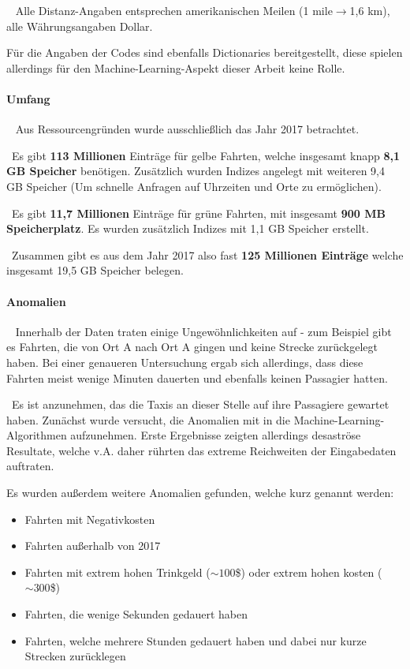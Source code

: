 ~\newline
Alle Distanz-Angaben entsprechen amerikanischen Meilen (1 mile$ \rightarrow $1,6 km), alle Währungsangaben Dollar. 

Für die Angaben der Codes sind ebenfalls Dictionaries bereitgestellt, diese spielen allerdings für den Machine-Learning-Aspekt dieser Arbeit keine Rolle.
\paragraph{Umfang} ~\newline
Aus Ressourcengründen wurde ausschließlich das Jahr 2017 betrachtet. 

~\newline Es gibt \textbf{113 Millionen} Einträge für gelbe Fahrten, welche insgesamt knapp \textbf{8,1 GB Speicher} benötigen. Zusätzlich wurden Indizes angelegt mit weiteren 9,4 GB Speicher (Um schnelle Anfragen auf Uhrzeiten und Orte zu ermöglichen).

~\newline Es gibt \textbf{11,7 Millionen} Einträge für grüne Fahrten, mit insgesamt \textbf{900 MB Speicherplatz}. Es wurden zusätzlich Indizes mit 1,1 GB Speicher erstellt. 

~\newline Zusammen gibt es aus dem Jahr 2017 also fast \textbf{125 Millionen Einträge} welche insgesamt 19,5 GB Speicher belegen.
\paragraph{Anomalien} ~\newline
Innerhalb der Daten traten einige Ungewöhnlichkeiten auf - zum Beispiel gibt es Fahrten, die von Ort A nach Ort A gingen und keine Strecke zurückgelegt haben. Bei einer genaueren Untersuchung ergab sich allerdings, dass diese Fahrten meist wenige Minuten dauerten und ebenfalls keinen Passagier hatten. 

~\newline Es ist anzunehmen, das die Taxis an dieser Stelle auf ihre Passagiere gewartet haben. Zunächst wurde versucht, die Anomalien mit in die Machine-Learning-Algorithmen aufzunehmen. Erste Ergebnisse zeigten allerdings desaströse Resultate, welche v.A. daher rührten das extreme Reichweiten der Eingabedaten auftraten. 

Es wurden außerdem weitere Anomalien gefunden, welche kurz genannt werden:
\begin{itemize}
	\item Fahrten mit Negativkosten
	\item Fahrten außerhalb von 2017
	\item Fahrten mit extrem hohen Trinkgeld ($\sim 100$\$) oder extrem hohen kosten ($\sim300$\$)
	\item Fahrten, die wenige Sekunden gedauert haben
	\item Fahrten, welche mehrere Stunden gedauert haben und dabei nur kurze Strecken zurücklegen
\end{itemize}


